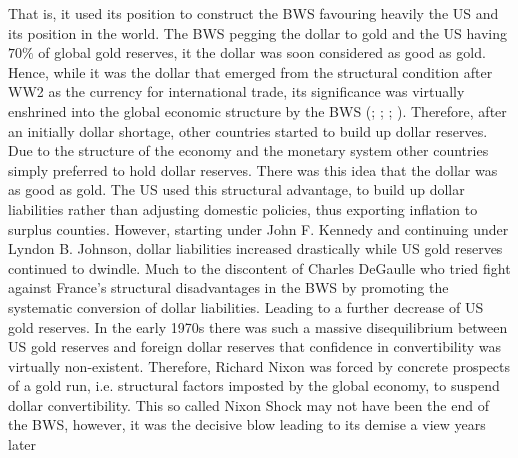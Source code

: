 \documentclass[11pt]{article}
\begin{document}
That is, it used its position to construct the BWS favouring heavily the US and its position in the world. The BWS pegging the dollar to gold and the US having $70 \%$ of global gold reserves, it the dollar was soon considered as good as gold. Hence, while it was the dollar that emerged from the structural condition after WW2 as the currency for international trade, its significance was virtually enshrined into the global economic structure by the BWS (\cite{KlimiukZbigniew2016TPaO,bordo2014tales,kindleberger1986world}; \cite[p.~107]{CohenBenjaminJ2004Tfom}; \cite[p.~229-230]{BeaudMichel1983Ahoc};  \cite[p.~34]{1993Arot}).
Therefore, after an initially dollar shortage, other countries started to build up dollar reserves. Due to the structure of the economy and the monetary system other countries simply preferred to hold dollar reserves. There was this idea that the dollar was as good as gold.
The US used this structural advantage, to build up dollar liabilities rather than adjusting domestic policies, thus exporting inflation to surplus counties. However, starting under John F. Kennedy and continuing under Lyndon B. Johnson, dollar liabilities increased drastically while US gold reserves continued to dwindle. Much to the discontent of Charles DeGaulle who tried fight against France's structural disadvantages in the BWS by promoting the systematic conversion of dollar liabilities. Leading to a further decrease of US gold reserves. 
In the early 1970s there was such a massive disequilibrium between US gold reserves and foreign dollar reserves that confidence in convertibility was virtually non-existent. Therefore, Richard Nixon was forced by concrete prospects of a gold run, i.e. structural factors imposted by the global economy, to suspend dollar convertibility. This so called Nixon Shock may not have been the end of the BWS, however, it was the decisive blow leading to its demise a view years later 
\end{document}
